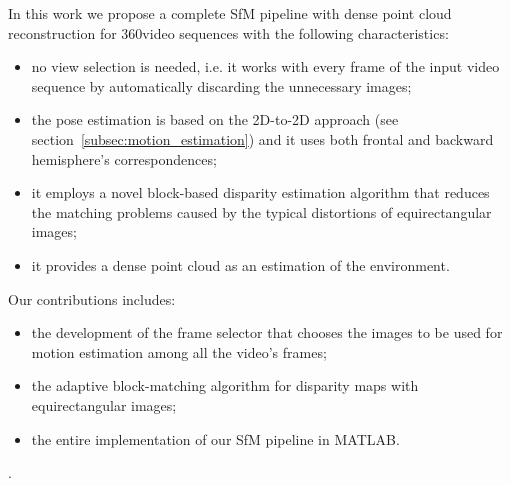 In this work we propose a complete SfM pipeline with dense point cloud 
reconstruction for 360\degree video sequences with the following 
characteristics:
\begin{itemize}
	\item no view selection is needed, i.e. it works with every frame of the 
	input video sequence by automatically discarding the unnecessary images;
	\item the pose estimation is based on the 2D-to-2D approach
	(see section~\ref{subsec:motion_estimation}) and it uses both frontal and
	backward hemisphere's correspondences;
	\item it employs a novel block-based disparity estimation algorithm that 
	reduces the matching problems caused by the
	typical distortions of equirectangular images;
	\item it provides a dense point cloud as an estimation of the environment.
\end{itemize}
Our contributions includes:
\begin{itemize}
	\item the development of the frame selector that chooses the images to be
	used for motion estimation among all the video's frames;
	\item the adaptive block-matching algorithm for disparity maps with 
	equirectangular images;
	\item the entire implementation of our SfM pipeline in MATLAB.
\end{itemize}.
